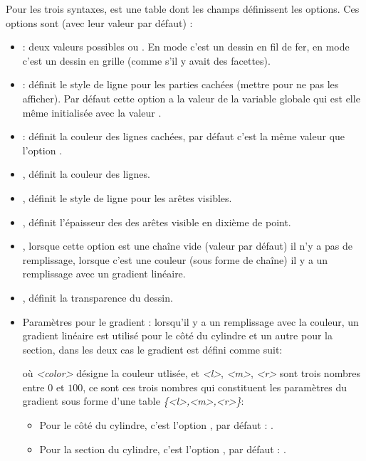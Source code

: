 Pour les trois syntaxes,  est une table dont les champs définissent les options. Ces options sont (avec leur valeur par défaut) :
\begin{itemize}
    \item {} : deux valeurs possibles  ou . En mode  c'est un dessin en fil de fer, en mode  c'est un dessin en grille (comme s'il y avait des facettes).
    
    \item {} : définit le style de ligne pour les parties cachées (mettre  pour ne pas les afficher). Par défaut cette option a la valeur de la variable globale  qui est elle même initialisée avec la valeur .
    
    \item {}: définit la couleur des lignes cachées, par défaut c'est la même valeur que l'option .
    
    \item {}, définit la couleur des lignes.
    
    \item {}, définit le style de ligne pour les arêtes visibles.

    \item {}, définit l'épaisseur des des arêtes visible en dixième de point.    
    
    \item {}, lorsque cette option est une chaîne vide (valeur par défaut) il n'y a pas de remplissage,  lorsque c'est une couleur (sous forme de chaîne) il y a un remplissage avec un gradient linéaire.
    
    \item {}, définit la transparence du dessin.
    
    \item Paramètres pour le gradient : lorsqu'il y a un remplissage avec la couleur, un gradient linéaire est utilisé pour le côté du cylindre et un autre pour la section, dans les deux cas le gradient est défini comme suit:\par
    où \emph{<color>} désigne la couleur utlisée, et \emph{<l>}, \emph{<m>}, \emph{<r>} sont trois nombres entre $0$ et $100$, ce sont ces trois nombres qui constituent les paramètres du gradient sous forme d'une table \emph{\{<l>,<m>,<r>\}}:
        \begin{itemize}
            \item Pour le côté du cylindre, c'est l'option , par défaut : .
            \item Pour la section du cylindre, c'est l'option , par défaut : .
        \end{itemize}
\end{itemize}

